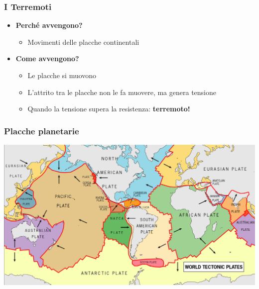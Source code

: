 \begin{frame}
	\frametitle{I Terremoti}
	\begin{itemize}
	\item \textbf{Perché avvengono?}
		\begin{itemize}
			\item \pause Movimenti delle placche continentali
		\end{itemize}
	\item \textbf{Come avvengono?}
		\begin{itemize}
			\item \pause Le placche si muovono
			\item \pause L'attrito tra le placche non le fa muovere, ma genera tensione
			\item \pause Quando la tensione supera la resistenza: \textbf{terremoto!}
		\end{itemize}
	\end{itemize}
\end{frame}
\begin{frame}
	\frametitle{Placche planetarie}
	\hspace{1em}
	\includegraphics[keepaspectratio=true,width=0.8\paperwidth]{tectonic-plate}
\end{frame}
